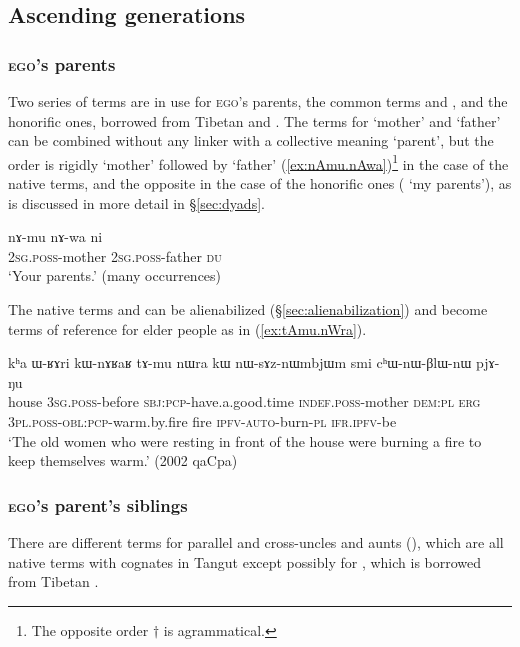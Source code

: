  \subsection{Ascending generations} \label{sec:G+1}
 
 \subsubsection{\textsc{ego}'s parents}
Two series of terms are in use for \textsc{ego}'s parents, the common terms  and , and the honorific ones, borrowed from Tibetan  and . The terms for `mother' and `father' can be combined without any linker with a collective meaning `parent', but the order is rigidly `mother' followed by `father' (\ref{ex:nAmu.nAwa})\footnote{The opposite order $\dagger$ is agrammatical. } in the case of the native terms, and the opposite in the case of the honorific ones  ( `my parents'), as is discussed in more detail in §\ref{sec:dyads}.

\begin{exe}
\ex \label{ex:nAmu.nAwa}
\gll nɤ-mu nɤ-wa ni  \\
\textsc{2sg}.\textsc{poss}-mother \textsc{2sg}.\textsc{poss}-father \textsc{du} \\
\glt  `Your parents.' (many occurrences)
\end{exe}

The native terms   and  can be alienabilized (§\ref{sec:alienabilization}) and become terms of reference for elder people as in (\ref{ex:tAmu.nWra}).

\begin{exe}
\ex \label{ex:tAmu.nWra}
\gll  kʰa ɯ-ʁɤri kɯ-nɤʁaʁ tɤ-mu nɯra kɯ nɯ-sɤz-nɯmbjɯm smi cʰɯ-nɯ-βlɯ-nɯ pjɤ-ŋu  \\
house \textsc{3sg}.\textsc{poss}-before \textsc{sbj}:\textsc{pcp}-have.a.good.time \textsc{indef}.\textsc{poss}-mother \textsc{dem}:\textsc{pl} \textsc{erg} \textsc{3pl}.\textsc{poss}-\textsc{obl}:\textsc{pcp}-warm.by.fire fire \textsc{ipfv}-\textsc{auto}-burn-\textsc{pl} \textsc{ifr}.\textsc{ipfv}-be \\
\glt `The old women who were resting in front of the house were burning a fire to keep themselves warm.' (2002 qaCpa)
\end{exe}
 
 \subsubsection{\textsc{ego}'s parent's siblings} \label{sec:uncle.aunt}
There are different terms for parallel and cross-uncles and aunts (), which are all native terms with cognates in Tangut \citep{jacques12kinship} except possibly for , which is borrowed from Tibetan . 
 
